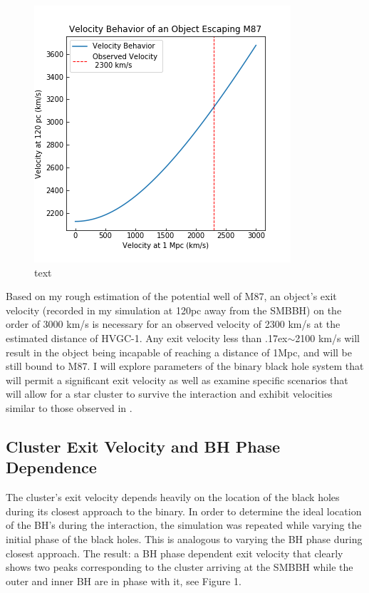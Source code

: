 \documentclass{aastex62}
\begin{document}
\begin{figure}
\includegraphics[scale=0.7]{./Images/velocity_behavior.png}
\centering
\caption{text}
\end{figure}
Based on my rough estimation of the potential well of M87, an object's exit velocity (recorded in my simulation at 120pc away from the SMBBH) on the order of 3000 km/s is necessary for an observed velocity of 2300 km/s at the estimated distance of HVGC-1. Any exit velocity less than {\raise.17ex\hbox{$\scriptstyle\mathtt{\sim}$}}2100 km/s will result in the object being incapable of reaching a distance of 1Mpc, and will be still bound to M87. I will explore parameters of the binary black hole system that will permit a significant exit velocity as well as examine specific scenarios that will allow for a star cluster to survive the interaction and exhibit velocities similar to those observed in \citet{cald14}.
\subsection{Cluster Exit Velocity and BH Phase Dependence}
The cluster's exit velocity depends heavily on the location of the black holes during its closest approach to the binary. In order to determine the ideal location of the BH's during the interaction, the simulation was repeated while varying the initial phase of the black holes. This is analogous to varying the BH phase during closest approach. The result: a BH phase dependent exit velocity that clearly shows two peaks corresponding to the cluster arriving at the SMBBH while the outer and inner BH are in phase with it, see Figure 1.
\end{document}
